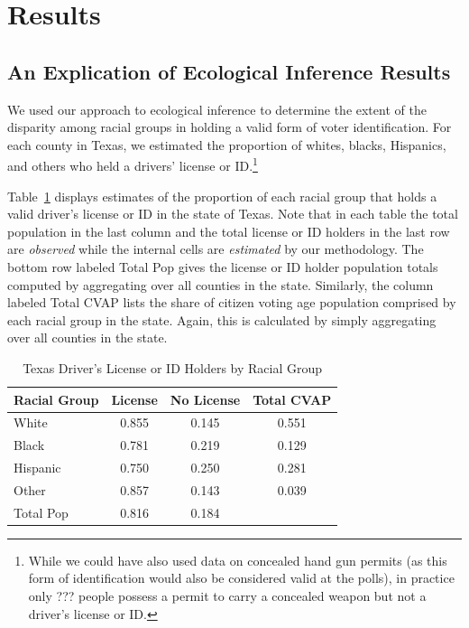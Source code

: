\documentclass[12pt]{article}
\begin{document}
\section{Results}\label{s:res}

\subsection{An Explication of Ecological Inference Results}

We used our approach to ecological inference to determine the extent
of the disparity among racial groups in holding a valid form of voter
identification. For each county in Texas, we estimated the proportion
of whites, blacks, Hispanics, and others who held a drivers'
license or ID.\footnote{While we could have also used data on concealed hand
  gun permits (as this form of identification would also be considered
  valid at the polls), in practice only ??? people possess a permit to
  carry a concealed weapon but not a driver's license or ID.}

Table~\ref{cvap_f3_ex} displays estimates of the proportion of each
racial group that holds a valid driver's license or ID in the state of
Texas. Note that in each table the total population in the last column
and the total license or ID holders in the last row are {\it observed} while
the internal cells are {\it estimated} by our methodology. The bottom
row labeled Total Pop gives the license or ID holder population totals
computed by aggregating over all counties in the state.  Similarly,
the column labeled Total CVAP lists the share of citizen voting age
population comprised by each racial group in the state.  Again, this
is calculated by simply aggregating over all counties in the state.

\begin{table}[ht]
\begin{center}
\caption{\label{cvap_f3_ex}Texas Driver's License or ID Holders by Racial Group}
\begin{tabular}{lccc}
  \hline
Racial Group & License & No License & Total CVAP\\
  \hline
White & 0.855 & 0.145 & 0.551 \\ 
Black & 0.781 & 0.219 & 0.129 \\ 
Hispanic & 0.750 & 0.250 & 0.281 \\ 
Other & 0.857 & 0.143 & 0.039 \\ 
Total Pop & 0.816 & 0.184 &   \\ 
   \hline

\end{tabular}
\end{center}
\end{table}
\end{document}
